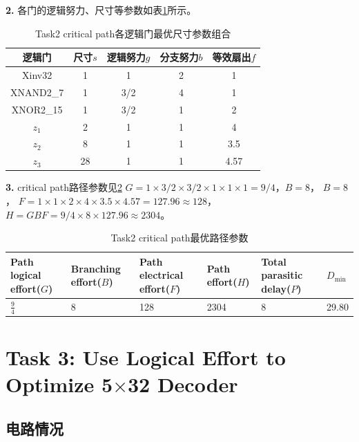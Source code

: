 \documentclass[UTF8,12pt,a4paper]{ctexart}
\begin{document}
\textbf{2.} 各门的逻辑努力、尺寸等参数如表\ref{tab:task2_best_gate_params}所示。

\begin{table}[htbp]
\centering
\caption{Task2 critical path各逻辑门最优尺寸参数组合}
\label{tab:task2_best_gate_params}
\begin{tabular}{ccccc}
\toprule
逻辑门 & 尺寸$s$ & 逻辑努力$g$ & 分支努力$b$ & 等效扇出$f$ \\
\midrule
Xinv32    & 1 & 1 & 2 & 1 \\
XNAND2\_7 & 1 & 3/2 & 4 & 1 \\
XNOR2\_15 & 1 & 3/2 & 1 & 2 \\
$z_1$     & 2 & 1 & 1 & 4 \\
$z_2$     & 8 & 1 & 1 & 3.5 \\
$z_3$     & 28 & 1 & 1 & 4.57 \\
\bottomrule
\end{tabular}
\end{table}

\textbf{3.} critical path路径参数见\ref{tab:task2_best_path_params}
$G = 1 \times 3/2 \times 3/2 \times 1 \times 1 \times 1 = 9/4 $，$B = 8 $，
$B = 8$，
$F = 1\times 1\times 2 \times 4 \times 3.5 \times 4.57 = 127.96 \approx 128$，
$H = GBF = 9/4 \times 8 \times 127.96 \approx 2304$。

\begin{table}[htbp]
    \centering
    \caption{Task2 critical path最优路径参数}
    \label{tab:task2_best_path_params}
    \begin{tabularx}{\linewidth}{XXXXXX}
    \toprule
    Path logical effort($G$) & Branching effort($B$) &
    Path electrical effort($F$) & Path effort($H$) &
    Total parasitic delay($P$) & $D_{\text{min}}$ \\
    \midrule
    $\frac{9}{4}$ & 8 & 128 & 2304 & 8 &  29.80 \\
    \bottomrule
    \end{tabularx}
\end{table}

\section{Task 3: Use Logical Effort to Optimize 5$\times$32 Decoder}

\subsection{电路情况}
\end{document}
